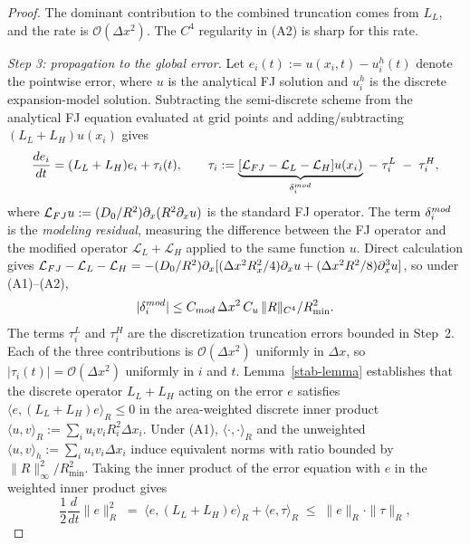 \documentclass[11pt]{article}
\begin{document}
\begin{proof}
    The dominant contribution to the combined truncation comes from $L_L$, and the rate is $\mathcal{O}(\Delta x^2)$. The $C^4$ regularity in (A2) is sharp for this rate.

    \emph{Step 3: propagation to the global error.}
    Let $e_i(t) := u(x_i, t) - u^h_i(t)$ denote the pointwise error, where $u$ is the analytical FJ solution and $u^h_i$ is the discrete expansion-model solution. Subtracting the semi-discrete scheme from the analytical FJ equation evaluated at grid points and adding/subtracting $(L_L + L_H) u(x_i)$ gives
    \begin{equation}
        \frac{d e_i}{dt} = (L_L + L_H) e_i + \tau_i(t), \qquad \tau_i := \underbrace{[\mathcal{L}_{\rm FJ} - \mathcal{L}_L - \mathcal{L}_H] u(x_i)}_{\delta^{\rm mod}_i} \;-\; \tau^L_i \;-\; \tau^H_i,
    \end{equation}
    where $\mathcal{L}_{\rm FJ} u := (D_0/R^2)\partial_x(R^2 \partial_x u)$ is the standard FJ operator. The term $\delta^{\rm mod}_i$ is the \emph{modeling residual}, measuring the difference between the FJ operator and the modified operator $\mathcal{L}_L + \mathcal{L}_H$ applied to the same function $u$. Direct calculation gives $\mathcal{L}_{\rm FJ} - \mathcal{L}_L - \mathcal{L}_H = -(D_0/R^2) \partial_x[(\Delta x^2 R_x^2/4)\partial_x u + (\Delta x^2 R^2/8) \partial_x^3 u]$, so under (A1)--(A2),
    \begin{equation}
        |\delta^{\rm mod}_i| \leq C_{\rm mod} \, \Delta x^2 \, C_u \, \|R\|_{C^4} / R_{\min}^2.
    \end{equation}
    The terms $\tau^L_i$ and $\tau^H_i$ are the discretization truncation errors bounded in Step~2. Each of the three contributions is $\mathcal{O}(\Delta x^2)$ uniformly in $\Delta x$, so $|\tau_i(t)| = \mathcal{O}(\Delta x^2)$ uniformly in $i$ and $t$. Lemma~\ref{stab-lemma} establishes that the discrete operator $L_L + L_H$ acting on the error $e$ satisfies $\langle e, (L_L + L_H) e \rangle_R \leq 0$ in the area-weighted discrete inner product $\langle u, v\rangle_R := \sum_i u_i v_i R_i^2 \Delta x_i$. Under (A1), $\langle\cdot, \cdot\rangle_R$ and the unweighted $\langle u, v\rangle_h := \sum_i u_i v_i \Delta x_i$ induce equivalent norms with ratio bounded by $\|R\|_\infty^2/R_{\min}^2$. Taking the inner product of the error equation with $e$ in the weighted inner product gives
    \begin{equation}
        \frac{1}{2} \frac{d}{dt} \|e\|_R^2 \;=\; \langle e, (L_L + L_H) e\rangle_R + \langle e, \tau\rangle_R \;\leq\; \|e\|_R \cdot \|\tau\|_R,

\end{equation}
\end{proof}
\end{document}
